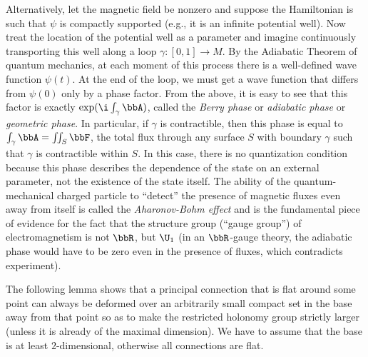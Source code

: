 \begin{example}
    Alternatively, let the magnetic field be nonzero and suppose the Hamiltonian is such that $\psi$ is compactly supported (e.g., it is an infinite potential well). Now treat the location of the potential well as a parameter and imagine continuously transporting this well along a loop $\gamma:[0,1]\to M$. By the Adiabatic Theorem of quantum mechanics, at each moment of this process there is a well-defined wave function $\psi(t)$. At the end of the loop, we must get a wave function that differs from $\psi(0)$ only by a phase factor. From the above, it is easy to see that this factor is exactly $\exp(\i\int_\gamma \bbA)$, called the \emph{Berry phase} or \emph{adiabatic phase} or \emph{geometric phase}. In particular, if $\gamma$ is contractible, then this phase is equal to $\int_\gamma\bbA=\iint_S \bbF$, the total flux through any surface $S$ with boundary $\gamma$ such that $\gamma$ is contractible within $S$. In this case, there is no quantization condition because this phase describes the dependence of the state on an external parameter, not the existence of the state itself. The ability of the quantum-mechanical charged particle to ``detect'' the presence of magnetic fluxes even away from itself is called the \emph{Aharonov-Bohm effect} and is the fundamental piece of evidence for the fact that the structure group (``gauge group'') of electromagnetism is not $\bbR$, but $\U_1$ (in an $\bbR$-gauge theory, the adiabatic phase would have to be zero even in the presence of fluxes, which contradicts experiment).

\end{example}

The following lemma shows that a principal connection that is flat around some point can always be deformed over an arbitrarily small compact set in the base away from that point so as to make the restricted holonomy group strictly larger (unless it is already of the maximal dimension). We have to assume that the base is at least $2$-dimensional, otherwise all connections are flat.

